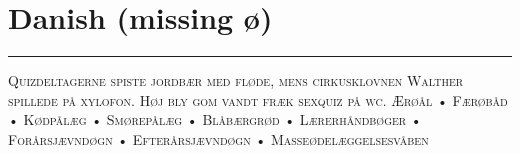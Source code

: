 \vspace{-1em}\section*{\checkno Danish (missing ø)}
\vspace{-.5em}\hrule\vspace{.5em}
\noindent\textsc{Quizdeltagerne spiste jordbær med fløde, 
mens cirkusklovnen Walther spillede på xylofon. 
Høj bly gom vandt fræk sexquiz på wc.
Ærøål • Færøbåd • Kødpålæg • Smørepålæg • Blåbærgrød • Lærerhåndbøger • 
Forårsjævndøgn • Efterårsjævndøgn • Masseødelæggelsesvåben}